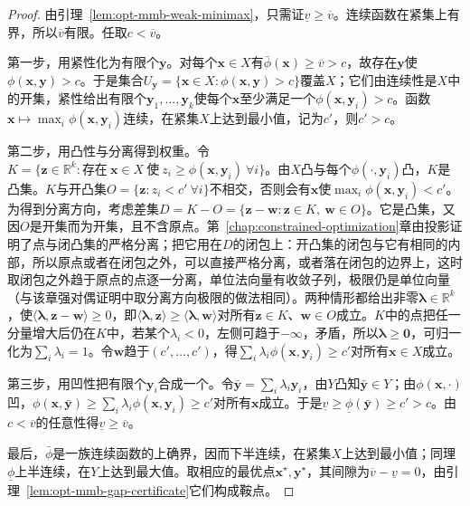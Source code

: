\begin{proof}
由引理~\ref{lem:opt-mmb-weak-minimax}，只需证$\underline v\geq\overline v$。连续函数在紧集上有界，所以$\overline v$有限。任取$c<\overline v$。

第一步，用紧性化为有限个$\bm y$。对每个$\bm x\in X$有$\bar\phi(\bm x)\geq\overline v>c$，故存在$\bm y$使$\phi(\bm x,\bm y)>c$。于是集合$U_{\bm y}=\{\bm x\in X:\phi(\bm x,\bm y)>c\}$覆盖$X$；它们由连续性是$X$中的开集，紧性给出有限个$\bm y_1,\dots,\bm y_k$使每个$\bm x$至少满足一个$\phi(\bm x,\bm y_i)>c$。函数$\bm x\mapsto\max_i\phi(\bm x,\bm y_i)$连续，在紧集$X$上达到最小值，记为$c'$，则$c'>c$。

第二步，用凸性与分离得到权重。令$K=\{\bm z\in\mathbb R^k:\text{存在}\ \bm x\in X\ \text{使}\ z_i\geq\phi(\bm x,\bm y_i)\ \forall i\}$。由$X$凸与每个$\phi(\cdot,\bm y_i)$凸，$K$是凸集。$K$与开凸集$O=\{\bm z:z_i<c'\ \forall i\}$不相交，否则会有$\bm x$使$\max_i\phi(\bm x,\bm y_i)<c'$。为得到分离方向，考虑差集$D=K-O=\{\bm z-\bm w:\bm z\in K,\ \bm w\in O\}$。它是凸集，又因$O$是开集而为开集，且不含原点。第~\ref{chap:constrained-optimization}章由投影证明了点与闭凸集的严格分离；把它用在$D$的闭包上：开凸集的闭包与它有相同的内部，所以原点或者在闭包之外，可以直接严格分离，或者落在闭包的边界上，这时取闭包之外趋于原点的点逐一分离，单位法向量有收敛子列，极限仍是单位向量（与该章强对偶证明中取分离方向极限的做法相同）。两种情形都给出非零$\bm\lambda\in\mathbb R^k$，使$\langle\bm\lambda,\bm z-\bm w\rangle\geq0$，即$\langle\bm\lambda,\bm z\rangle\geq\langle\bm\lambda,\bm w\rangle$对所有$\bm z\in K$、$\bm w\in O$成立。$K$中的点把任一分量增大后仍在$K$中，若某个$\lambda_i<0$，左侧可趋于$-\infty$，矛盾，所以$\bm\lambda\geq\bm 0$，可归一化为$\sum_i\lambda_i=1$。令$\bm w$趋于$(c',\dots,c')$，得$\sum_i\lambda_i\phi(\bm x,\bm y_i)\geq c'$对所有$\bm x\in X$成立。

第三步，用凹性把有限个$\bm y_i$合成一个。令$\bar{\bm y}=\sum_i\lambda_i\bm y_i$，由$Y$凸知$\bar{\bm y}\in Y$；由$\phi(\bm x,\cdot)$凹，$\phi(\bm x,\bar{\bm y})\geq\sum_i\lambda_i\phi(\bm x,\bm y_i)\geq c'$对所有$\bm x$成立。于是$\underline v\geq\underline\phi(\bar{\bm y})\geq c'>c$。由$c<\overline v$的任意性得$\underline v\geq\overline v$。

最后，$\bar\phi$是一族连续函数的上确界，因而下半连续，在紧集$X$上达到最小值；同理$\underline\phi$上半连续，在$Y$上达到最大值。取相应的最优点$\bm x^\star,\bm y^\star$，其间隙为$\overline v-\underline v=0$，由引理~\ref{lem:opt-mmb-gap-certificate}它们构成鞍点。
\end{proof}

